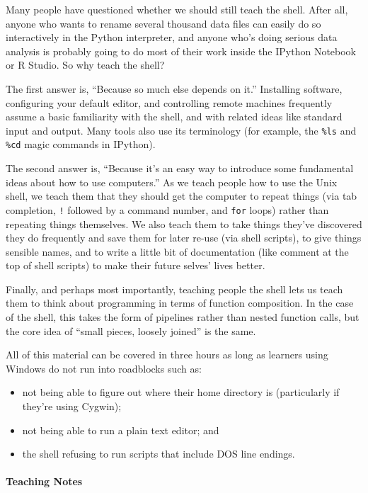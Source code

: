 \documentclass[]{book}
\begin{document}
Many people have questioned whether we should still teach the shell.
After all, anyone who wants to rename several thousand data files can
easily do so interactively in the Python interpreter, and anyone who's
doing serious data analysis is probably going to do most of their work
inside the IPython Notebook or R Studio. So why teach the shell?

The first answer is, ``Because so much else depends on it.'' Installing
software, configuring your default editor, and controlling remote
machines frequently assume a basic familiarity with the shell, and with
related ideas like standard input and output. Many tools also use its
terminology (for example, the \texttt{\%ls} and \texttt{\%cd} magic
commands in IPython).

The second answer is, ``Because it's an easy way to introduce some
fundamental ideas about how to use computers.'' As we teach people how
to use the Unix shell, we teach them that they should get the computer
to repeat things (via tab completion, \texttt{!} followed by a command
number, and \texttt{for} loops) rather than repeating things themselves.
We also teach them to take things they've discovered they do frequently
and save them for later re-use (via shell scripts), to give things
sensible names, and to write a little bit of documentation (like comment
at the top of shell scripts) to make their future selves' lives better.

Finally, and perhaps most importantly, teaching people the shell lets us
teach them to think about programming in terms of function composition.
In the case of the shell, this takes the form of pipelines rather than
nested function calls, but the core idea of ``small pieces, loosely
joined'' is the same.

All of this material can be covered in three hours as long as learners
using Windows do not run into roadblocks such as:

\begin{itemize}
\item
  not being able to figure out where their home directory is
  (particularly if they're using Cygwin);
\item
  not being able to run a plain text editor; and
\item
  the shell refusing to run scripts that include DOS line endings.
\end{itemize}

\mbox{}\paragraph{Teaching Notes}
\end{document}
